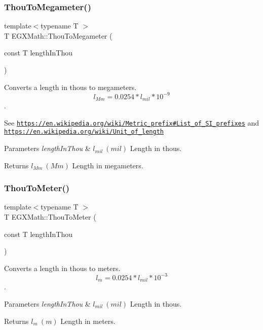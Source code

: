 \subsubsection{\texorpdfstring{Thou\+To\+Megameter()}{ThouToMegameter()}}
{\footnotesize\ttfamily template$<$typename T $>$ \\
T E\+G\+X\+Math\+::\+Thou\+To\+Megameter (\begin{DoxyParamCaption}\item[{const T}]{length\+In\+Thou }\end{DoxyParamCaption})}



Converts a length in thous to megameters. \[ l_{Mm}=0.0254 * l_{mil} * 10^{-9} \]. 

See \href{https://en.wikipedia.org/wiki/Metric_prefix#List_of_SI_prefixes}{\tt https\+://en.\+wikipedia.\+org/wiki/\+Metric\+\_\+prefix\#\+List\+\_\+of\+\_\+\+S\+I\+\_\+prefixes} and \href{https://en.wikipedia.org/wiki/Unit_of_length}{\tt https\+://en.\+wikipedia.\+org/wiki/\+Unit\+\_\+of\+\_\+length} 
\begin{DoxyParams}{Parameters}
{\em length\+In\+Thou} & $ l_{mil}\ (mil)$ Length in thous. \\
\hline
\end{DoxyParams}
\begin{DoxyReturn}{Returns}
$ l_{Mm}\ (Mm)$ Length in megameters. 
\end{DoxyReturn}
\mbox{\label{group___e_g_x_math-_conversions-_length_conversions-_imperial-_thou-_s_i_ga0d5d19b317eee7fc8c2a4c24195e8ed5}} 
\subsubsection{\texorpdfstring{Thou\+To\+Meter()}{ThouToMeter()}}
{\footnotesize\ttfamily template$<$typename T $>$ \\
T E\+G\+X\+Math\+::\+Thou\+To\+Meter (\begin{DoxyParamCaption}\item[{const T}]{length\+In\+Thou }\end{DoxyParamCaption})}



Converts a length in thous to meters. \[ l_{m}=0.0254 * l_{mil} * 10^{-3} \]. 


\begin{DoxyParams}{Parameters}
{\em length\+In\+Thou} & $ l_{mil}\ (mil)$ Length in thous. \\
\hline
\end{DoxyParams}
\begin{DoxyReturn}{Returns}
$ l_{m}\ (m)$ Length in meters. 
\end{DoxyReturn}
\mbox{\label{group___e_g_x_math-_conversions-_length_conversions-_imperial-_thou-_s_i_gaa3207ca1334f385f584132c109345a6d}} 
